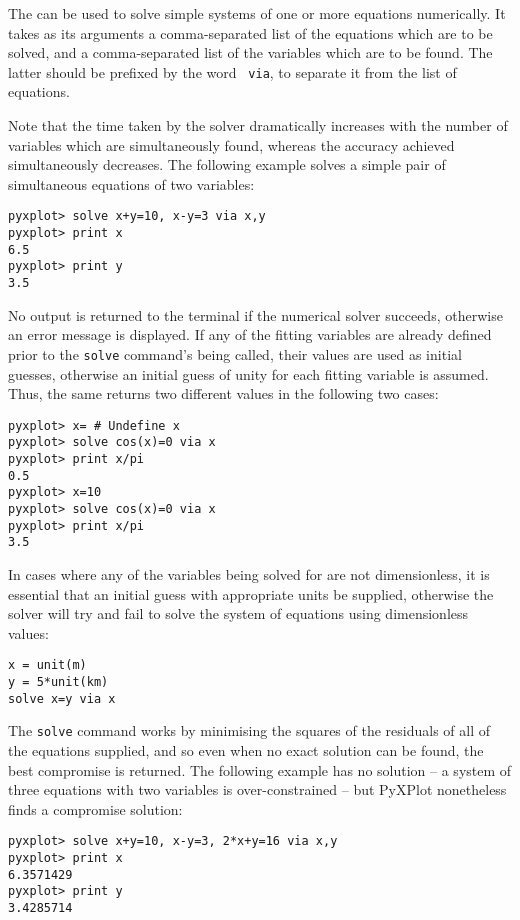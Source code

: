The  can be used to solve simple systems of one or more
equations numerically. It takes as its arguments a comma-separated list of the
equations which are to be solved, and a comma-separated list of the variables
which are to be found. The latter should be prefixed by the word {\tt
via}, to separate it from the list of equations.

Note that the time taken by the solver dramatically increases with the number
of variables which are simultaneously found, whereas the accuracy achieved
simultaneously decreases. The following example solves a simple pair of
simultaneous equations of two variables:

\begin{verbatim}
pyxplot> solve x+y=10, x-y=3 via x,y
pyxplot> print x
6.5
pyxplot> print y
3.5
\end{verbatim}

\noindent No output is returned to the terminal if the numerical solver
succeeds, otherwise an error message is displayed. If any of the fitting
variables are already defined prior to the {\tt solve} command's being called,
their values are used as initial guesses, otherwise an initial guess of unity
for each fitting variable is assumed. Thus, the same  returns
two different values in the following two cases:

\begin{verbatim}
pyxplot> x= # Undefine x
pyxplot> solve cos(x)=0 via x
pyxplot> print x/pi
0.5
pyxplot> x=10
pyxplot> solve cos(x)=0 via x
pyxplot> print x/pi
3.5
\end{verbatim}

\noindent In cases where any of the variables being solved for are not
dimensionless, it is essential that an initial guess with appropriate units be
supplied, otherwise the solver will try and fail to solve the system of
equations using dimensionless values:

\begin{verbatim}
x = unit(m)
y = 5*unit(km)
solve x=y via x
\end{verbatim}

The {\tt solve} command works by minimising the squares of the residuals of all
of the equations supplied, and so even when no exact solution can be found, the
best compromise is returned. The following example has no solution -- a system
of three equations with two variables is over-constrained -- but PyXPlot
nonetheless finds a compromise solution:

\begin{verbatim}
pyxplot> solve x+y=10, x-y=3, 2*x+y=16 via x,y
pyxplot> print x
6.3571429
pyxplot> print y
3.4285714
\end{verbatim}

